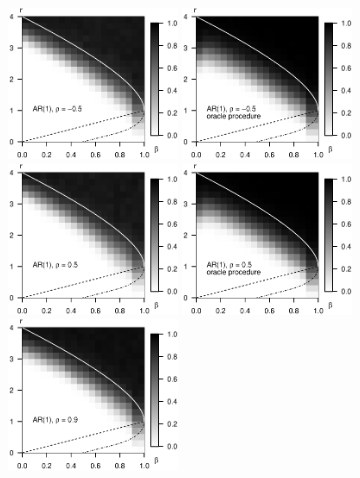 \begin{figure}
    \centering
    \includegraphics[width=0.4\textwidth]{./figures/simulated_phase_diagram_AR-05_p10000.eps}
    \includegraphics[width=0.4\textwidth]{./figures/simulated_phase_diagram_AR-05_p10000_oracle.eps}
    \includegraphics[width=0.4\textwidth]{./figures/simulated_phase_diagram_AR05_p10000.eps}
    \includegraphics[width=0.4\textwidth]{./figures/simulated_phase_diagram_AR05_p10000_oracle.eps}
    \includegraphics[width=0.4\textwidth]{./figures/simulated_phase_diagram_AR09_p10000.eps}

\end{figure}
